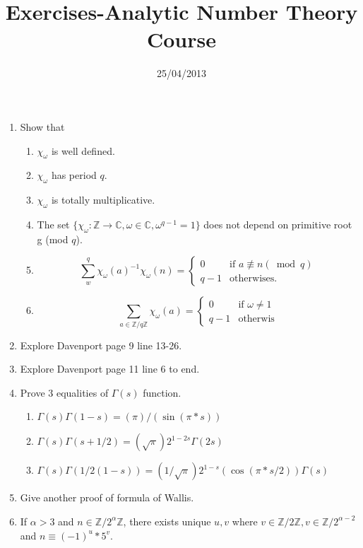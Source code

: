 \documentclass[a4paper,10pt]{article}
\title{Exercises-Analytic Number Theory Course}
\author{25/04/2013}
\newcommand{\ZZ}{\mathbb Z}
\newcommand{\CC}{\mathbb C}
\begin{document}
\maketitle
\begin{enumerate}
 \item Show that
 \begin{enumerate}
  \item ${\chi}_\omega$ is well defined.
  \item ${\chi}_\omega$ has period $q$.
  \item ${\chi}_\omega$ is totally multiplicative.
  \item The set $\{{\chi}_\omega : \ZZ\rightarrow\CC, \omega \in\CC , \omega^{q-1}= 1  \}$ does not depend on primitive root g (mod $q$).  
  \item $$\sum_{w}^q {\chi_\omega(a)}^{-1} {\chi_\omega(n)}= \begin{cases}
                                                              0 & \text{if } a\not \equiv n (\bmod q)\\
                                                              q-1 & \text{otherwises.}
                                                             \end{cases}$$
  \item $$\sum_{a\in \ZZ/q\ZZ} {\chi_\omega(a)}=\begin{cases}
                                                 0 & \text{if }\omega\not=1\\
                                                 q-1 & \text{otherwis}
                                                 \end{cases}$$
  \end{enumerate}
 \item Explore Davenport page 9 line 13-26.
\item Explore Davenport page 11 line 6 to end.
 \item  Prove $3$ equalities of $\Gamma(s)$ function.
 \begin{enumerate}
  \item $\Gamma(s)\Gamma(1-s)= (\pi)/(\sin(\pi*s)) $
  \item $\Gamma(s)\Gamma(s+1/2)= (\sqrt\pi)2^{1-2s}\Gamma(2s) $
  \item $\Gamma(s)\Gamma(1/2(1-s))= (1/\sqrt\pi) 2^{1-s} (\cos(\pi*s/2)) \Gamma(s) $
 \end{enumerate}
\item Give another proof of formula of Wallis.
\item If $\alpha >3$ and $ n\in \ZZ/2^\alpha\ZZ$, there exists unique $u,v$ where $v\in\ZZ/2\ZZ, v\in\ZZ/2^{\alpha-2}$ and $n\equiv(-1)^u*5^v$.

\end{enumerate}
\end{document}
